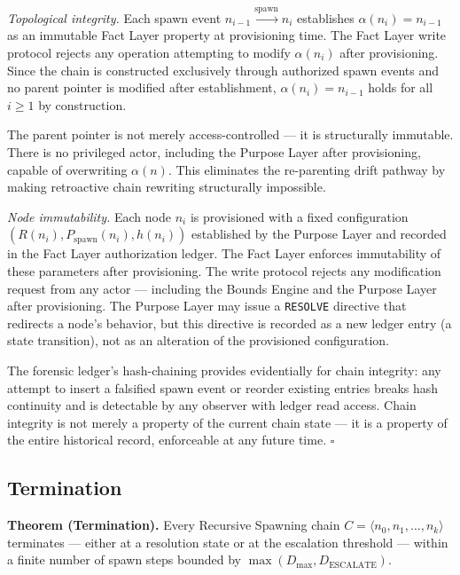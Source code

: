 \medskip
\textit{Topological integrity.}
Each spawn event $n_{i-1} \xrightarrow{\mathrm{spawn}} n_i$ establishes $\alpha(n_i) = n_{i-1}$ as an immutable Fact Layer property at provisioning time. The Fact Layer write protocol rejects any operation attempting to modify $\alpha(n_i)$ after provisioning. Since the chain is constructed exclusively through authorized spawn events and no parent pointer is modified after establishment, $\alpha(n_i) = n_{i-1}$ holds for all $i \geq 1$ by construction.

The parent pointer is not merely access-controlled — it is structurally immutable. There is no privileged actor, including the Purpose Layer after provisioning, capable of overwriting $\alpha(n)$. This eliminates the re-parenting drift pathway by making retroactive chain rewriting structurally impossible.

\medskip
\textit{Node immutability.}
Each node $n_i$ is provisioned with a fixed configuration $(R(n_i), P_{\mathrm{spawn}}(n_i), h(n_i))$ established by the Purpose Layer and recorded in the Fact Layer authorization ledger. The Fact Layer enforces immutability of these parameters after provisioning. The write protocol rejects any modification request from any actor — including the Bounds Engine and the Purpose Layer after provisioning. The Purpose Layer may issue a \texttt{RESOLVE} directive that redirects a node's behavior, but this directive is recorded as a new ledger entry (a state transition), not as an alteration of the provisioned configuration.

The forensic ledger's hash-chaining provides evidentially for chain integrity: any attempt to insert a falsified spawn event or reorder existing entries breaks hash continuity and is detectable by any observer with ledger read access. Chain integrity is not merely a property of the current chain state — it is a property of the entire historical record, enforceable at any future time. $\square$

\subsection{Termination}
\label{sec:rs-termination}

\medskip
\noindent\textbf{Theorem (Termination).}
Every Recursive Spawning chain $C = \langle n_0, n_1, \ldots, n_k \rangle$ terminates — either at a resolution state or at the escalation threshold — within a finite number of spawn steps bounded by $\max(D_{\mathrm{max}}, D_{\mathrm{ESCALATE}})$.


